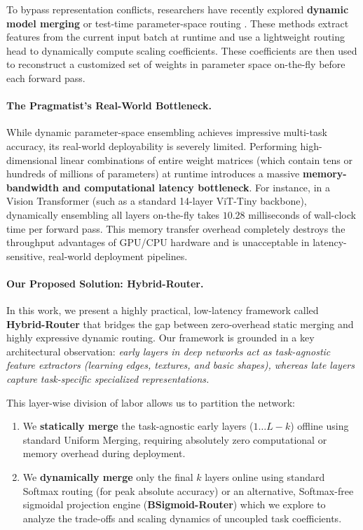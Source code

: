 To bypass representation conflicts, researchers have recently explored \textbf{dynamic model merging} or test-time parameter-space routing \cite{qwsmerge, polymerge}. These methods extract features from the current input batch at runtime and use a lightweight routing head to dynamically compute scaling coefficients. These coefficients are then used to reconstruct a customized set of weights in parameter space on-the-fly before each forward pass. 

\paragraph{The Pragmatist's Real-World Bottleneck.}
While dynamic parameter-space ensembling achieves impressive multi-task accuracy, its real-world deployability is severely limited. Performing high-dimensional linear combinations of entire weight matrices (which contain tens or hundreds of millions of parameters) at runtime introduces a massive \textbf{memory-bandwidth and computational latency bottleneck}. 
For instance, in a Vision Transformer (such as a standard 14-layer ViT-Tiny backbone), dynamically ensembling all layers on-the-fly takes $10.28$ milliseconds of wall-clock time per forward pass. This memory transfer overhead completely destroys the throughput advantages of GPU/CPU hardware and is unacceptable in latency-sensitive, real-world deployment pipelines.

\paragraph{Our Proposed Solution: Hybrid-Router.}
In this work, we present a highly practical, low-latency framework called \textbf{Hybrid-Router} that bridges the gap between zero-overhead static merging and highly expressive dynamic routing. Our framework is grounded in a key architectural observation: \emph{early layers in deep networks act as task-agnostic feature extractors (learning edges, textures, and basic shapes), whereas late layers capture task-specific specialized representations.} 

This layer-wise division of labor allows us to partition the network:
\begin{enumerate}
    \item We \textbf{statically merge} the task-agnostic early layers ($1 \dots L-k$) offline using standard Uniform Merging, requiring absolutely zero computational or memory overhead during deployment.
    \item We \textbf{dynamically merge} only the final $k$ layers online using standard Softmax routing (for peak absolute accuracy) or an alternative, Softmax-free sigmoidal projection engine (\textbf{BSigmoid-Router}) which we explore to analyze the trade-offs and scaling dynamics of uncoupled task coefficients.
\end{enumerate}

